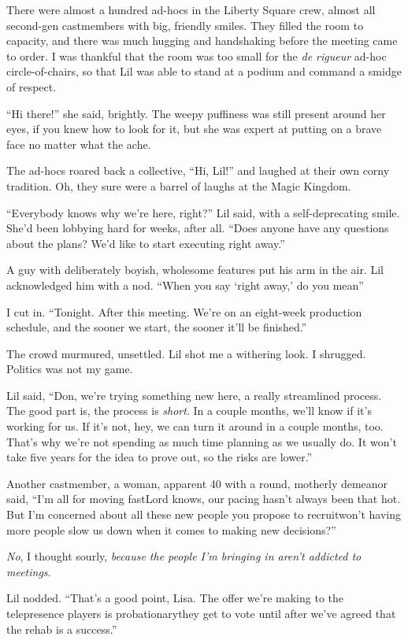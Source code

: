There were almost a hundred ad-hocs in the Liberty Square crew,
almost all second-gen castmembers with big, friendly smiles. They
filled the room to capacity, and there was much hugging and
handshaking before the meeting came to order. I was thankful that
the room was too small for the \emph{de rigueur} ad-hoc
circle-of-chairs, so that Lil was able to stand at a podium and
command a smidge of respect.

“Hi there!” she said, brightly. The weepy puffiness was still
present around her eyes, if you knew how to look for it, but she
was expert at putting on a brave face no matter what the ache.

The ad-hocs roared back a collective, “Hi, Lil!” and laughed at
their own corny tradition. Oh, they sure were a barrel of laughs at
the Magic Kingdom.

“Everybody knows why we're here, right?” Lil said, with a
self-deprecating smile. She'd been lobbying hard for weeks, after
all. “Does anyone have any questions about the plans? We'd like to
start executing right away.”

A guy with deliberately boyish, wholesome features put his arm in
the air. Lil acknowledged him with a nod. “When you say ‘right
away,’ do you mean{\dash}”

I cut in. “Tonight. After this meeting. We're on an eight-week
production schedule, and the sooner we start, the sooner it'll be
finished.”

The crowd murmured, unsettled. Lil shot me a withering look. I
shrugged. Politics was not my game.

Lil said, “Don, we're trying something new here, a really
streamlined process. The good part is, the process is \emph{short}.
In a couple months, we'll know if it's working for us. If it's not,
hey, we can turn it around in a couple months, too. That's why
we're not spending as much time planning as we usually do. It won't
take five years for the idea to prove out, so the risks are
lower.”

Another castmember, a woman, apparent 40 with a round, motherly
demeanor said, “I'm all for moving fast{\dash}Lord knows, our pacing
hasn't always been that hot. But I'm concerned about all these new
people you propose to recruit{\dash}won't having more people slow us down
when it comes to making new decisions?”

\emph{No}, I thought sourly,
\emph{because the people I'm bringing in aren't addicted to meetings}.

Lil nodded. “That's a good point, Lisa. The offer we're making to
the telepresence players is probationary{\dash}they  get to vote
until after we've agreed that the rehab is a success.”

